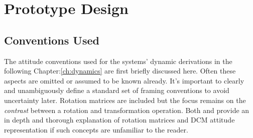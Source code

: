 \chapter{Prototype Design}
\label{ch:proto}
\section{Conventions Used}
\label{sec:proto.conventions}
The attitude conventions used for the systems' dynamic derivations in the following Chapter:\ref{ch:dynamics} are first briefly discussed here. Often these aspects are omitted or assumed to be known already. It's important to clearly and unambiguously define a standard set of framing conventions to avoid uncertainty later. Rotation matrices are included but the focus remains on the \emph{contrast} between a rotation and transformation operation. Both \cite{spacecraftattitutdequaternions} and \cite{rigidbodylecture} provide an in depth and thorough explanation of rotation matrices and DCM attitude representation if such concepts are unfamiliar to the reader.
